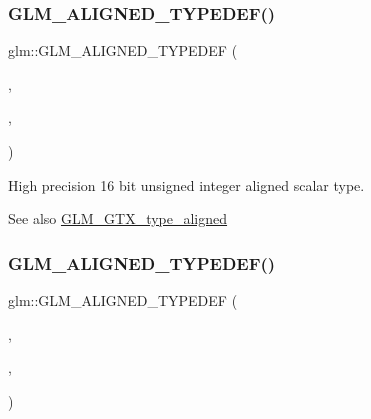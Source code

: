 \subsubsection{\texorpdfstring{G\+L\+M\+\_\+\+A\+L\+I\+G\+N\+E\+D\+\_\+\+T\+Y\+P\+E\+D\+E\+F()}{GLM\_ALIGNED\_TYPEDEF()}\hspace{0.1cm}{\footnotesize\ttfamily [94/209]}}
{\footnotesize\ttfamily glm\+::\+G\+L\+M\+\_\+\+A\+L\+I\+G\+N\+E\+D\+\_\+\+T\+Y\+P\+E\+D\+EF (\begin{DoxyParamCaption}\item[{\hyperlink{group__gtc__type__precision_ga4d32967d45ba8365e2a05eaaac85e978}{highp\+\_\+uint16}}]{,  }\item[{aligned\+\_\+highp\+\_\+uint16}]{,  }\item[{2}]{ }\end{DoxyParamCaption})}

High precision 16 bit unsigned integer aligned scalar type. \begin{DoxySeeAlso}{See also}
\hyperlink{group__gtx__type__aligned}{G\+L\+M\+\_\+\+G\+T\+X\+\_\+type\+\_\+aligned} 
\end{DoxySeeAlso}
\mbox{\label{group__gtx__type__aligned_ga6027ae13b2734f542a6e7beee11b8820}} 
\subsubsection{\texorpdfstring{G\+L\+M\+\_\+\+A\+L\+I\+G\+N\+E\+D\+\_\+\+T\+Y\+P\+E\+D\+E\+F()}{GLM\_ALIGNED\_TYPEDEF()}\hspace{0.1cm}{\footnotesize\ttfamily [95/209]}}
{\footnotesize\ttfamily glm\+::\+G\+L\+M\+\_\+\+A\+L\+I\+G\+N\+E\+D\+\_\+\+T\+Y\+P\+E\+D\+EF (\begin{DoxyParamCaption}\item[{\hyperlink{group__gtc__type__precision_ga3145e44c73e2df7dfe4f3cb65974bf22}{highp\+\_\+uint32}}]{,  }\item[{aligned\+\_\+highp\+\_\+uint32}]{,  }\item[{4}]{ }\end{DoxyParamCaption})}


